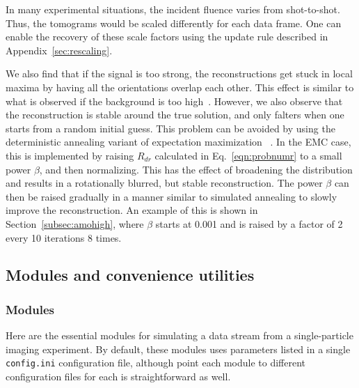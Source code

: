 \documentclass[]{iucr}              %
\begin{document}
In many experimental situations, the incident fluence varies from shot-to-shot. Thus, the tomograms would be scaled differently for each data frame. One can enable the recovery of these scale factors using the update rule described in Appendix~\ref{sec:rescaling}. 

We also find that if the signal is too strong, the reconstructions get stuck in local maxima by having all the orientations overlap each other. This effect is similar to what is observed if the background is too high~\cite{ayyer2015}. However, we also observe that the reconstruction is stable around the true solution, and only falters when one starts from a random initial guess. This problem can be avoided by using the deterministic annealing variant of expectation maximization ~\cite{ueda1998}. In the EMC case, this is implemented by raising $R_{dr}$ calculated in Eq.~\ref{eqn:probnumr} to a small power $\beta$, and then normalizing. This has the effect of broadening the distribution and results in a rotationally blurred, but stable reconstruction. The power $\beta$ can then be raised gradually in a manner similar to simulated annealing to slowly improve the reconstruction. An example of this is shown in Section~\ref{subsec:amohigh}, where $\beta$ starts at 0.001 and is raised by a factor of 2 every 10 iterations 8 times.

\subsection{Modules and convenience utilities}\label{subsec:mod+utils}
\subsubsection{Modules}\label{subsubsec:mods}
Here are the essential modules for simulating a data stream from a single-particle imaging experiment. By default, these modules uses parameters listed in a single \texttt{config.ini} configuration file, although point each module to different configuration files for each is straightforward as well.
\end{document}
